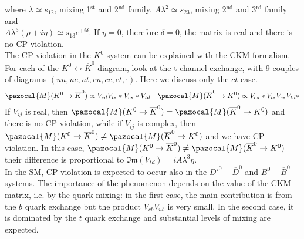\documentclass[10.75pt,a4paper,openright,bottom=2cm]{article}
\begin{document}
where $\lambda\simeq s_{12}$, mixing 1$^{\text{st}}$ and 2$^{\text{nd}}$ family, $A\lambda^2\simeq s_{23}$, mixing 2$^{\text{nd}}$ and 3$^{\text{rd}}$ family and\\
$A\lambda^3(\rho+i\eta)\simeq s_{13}e^{+i\delta}$. If $\eta=0$, therefore $\delta=0$, the matrix is real and there is no CP violation.\\
The CP violation in the $K^0$ system can be explained with the CKM formalism. For each of the $K^0\leftrightarrow\overline{K}^0$ diagram, look at the t-channel exchange, with 9 couples of diagrams $(uu,uc,ut,cu,cc,ct,\cdot)$. Here we discuss only the $ct$ case.
\[
\pazocal{M}(K^0\to\overline{K}^0)\propto V_{cd}V_{ts}*V_{cs}*V_{td} \quad \pazocal{M}(\overline{K}^0\to K^0)\propto V_{cs}*V_{ts}V_{cs}V_{td}*
\]
If $V_{ij}$ is real, then $\pazocal{M}(K^0\to\overline{K}^0)=\pazocal{M}(\overline{K}^0\to K^0)$ and there is no CP violation, while if $V_{ij}$ is complex, then $\pazocal{M}(K^0\to\overline{K}^0)\neq\pazocal{M}(\overline{K}^0\to K^0)$ and we have CP violation. In this case, $\pazocal{M}(K^0\to\overline{K}^0)\neq\pazocal{M}(\overline{K}^0\to K^0)$ their difference is proportional to $\mathfrak{Im}(V_{td})=iA\lambda^3\eta$.\\
In the SM, CP violation is expected to occur also in the $D'^0-\overline{D}^0$ and $B^0-\overline{B}^0$ systems. The importance of the phenomenon depends on the value of the CKM matrix, i.e. by the quark mixing: in the first case, the main contribution is from the $b$ quark exchange but the product $V_{cb}V_{ub}$ is very small. In the second case, it is dominated by the $t$ quark exchange and substantial levels of mixing are expected.
\end{document}
